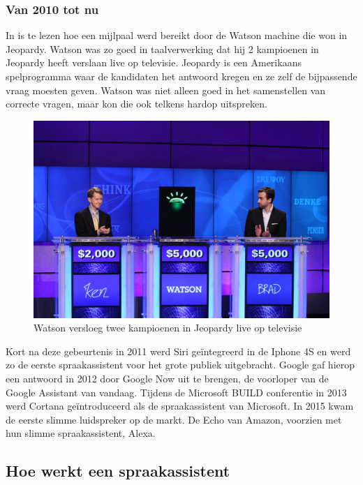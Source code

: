 \subsubsection{Van 2010 tot nu}
In \autocite{IBM2011} is te lezen hoe een mijlpaal werd bereikt door de Watson machine die won in Jeopardy. Watson was zo goed in taalverwerking dat hij 2 kampioenen in Jeopardy heeft verslaan live op televisie. Jeopardy is een Amerikaans spelprogramma waar de kandidaten het antwoord kregen en ze zelf de bijpassende vraag moesten geven. Watson was niet alleen goed in het samenstellen van correcte vragen, maar kon die ook telkens hardop uitspreken.

\begin{figure}[h]
    \includegraphics[width=0.7\linewidth]{img/WatsonJeopardy}
    \caption{Watson versloeg twee kampioenen in Jeopardy live op televisie \autocite{Markoff2011}}
    \label{fig:smartassist}
\end{figure}

Kort na deze gebeurtenis in 2011 werd Siri geïntegreerd in de Iphone 4S en werd zo de eerste spraakassistent voor het grote publiek uitgebracht. Google gaf hierop een antwoord in 2012 door Google Now uit te brengen, de voorloper van de Google Assistant van vandaag. Tijdens de Microsoft BUILD conferentie in 2013 werd Cortana geïntroduceerd als de spraakassistent van Microsoft. In 2015 kwam de eerste slimme luidspreker op de markt. De Echo van Amazon, voorzien met hun slimme spraakassistent, Alexa.

\subsection{Hoe werkt een spraakassistent}

